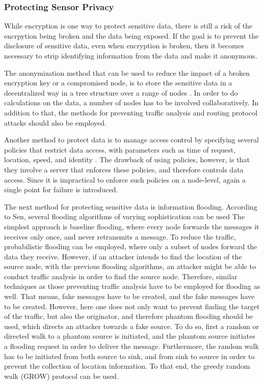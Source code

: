 \documentclass[12pt,a4paper,twoside]{report}
\begin{document}
\subsubsection{Protecting Sensor Privacy}
While encryption is one way to protect sensitive data, there is still a risk of the encrpytion being broken and the data being exposed. If the goal is to prevent the disclosure of sensitive data, even when encryption is broken, then it becomes necessary to strip identifying information from the data and make it anonymous. \par
The anonymization method that can be used to reduce the impact of a broken encryption key or a compromised node, is to store the sensitive data in a decentralized way in a tree structure over a range of nodes \cite{sen:2009}. In order to do calculations on the data, a number of nodes has to be involved collaboratively. In addition to that, the methods for preventing traffic analysis and routing protocol attacks should also be employed.\par
Another method to protect data is to manage access control by specifying several policies that restrict data access, with parameters such as time of request, location, speed, and identity \cite{sen:2009}. The drawback of using policies, however, is that they involve a server that enforces these policies, and therefore controls data access. Since it is impractical to enforce such policies on a node-level, again a single point for failure is introduced.\par
The next method for protecting sensitive data is information flooding. According to Sen, several flooding algorithms of varying sophistication can be used \cite{sen:2009} The simplest approach is baseline flooding, where every node forwards the messages it receives only once, and never retransmits a message. To reduce the traffic, probabilistic flooding can be employed, where only a subset of nodes forward the data they receive. However, if an attacker intends to find the location of the source node, with the previous flooding algorithms, an attacker might be able to conduct traffic analysis in order to find the source node. Therefore, similar techniques as those preventing traffic analysis have to be employed for flooding as well. That means, fake messages have to be created, and the fake messages have to be created. However, here one does not only want to prevent finding the target of the traffic, but also the originator, and therefore phantom flooding should be used, which directs an attacker towards a fake source. To do so, first a random or directed walk to a phantom source is initiated, and the phantom source initiates a flooding request in order to deliver the message. Furthermore, the random walk has to be initiated from both source to sink, and from sink to source in order to prevent the collection of location information. To that end, the greedy random walk  (GROW) protocol can be used.\par
\end{document}
